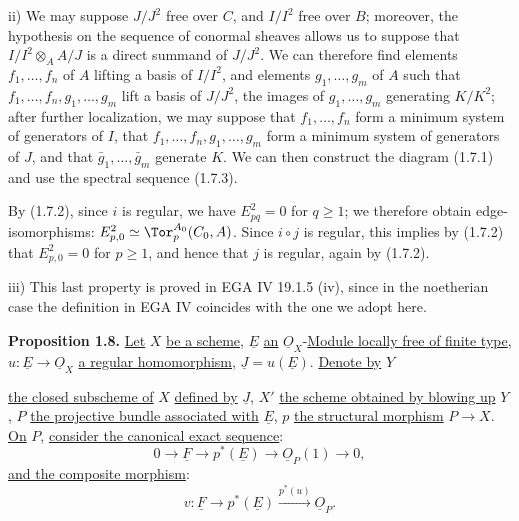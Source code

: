 ii) We may suppose $J/J^2$ free over $C$, and $I/I^2$ free over $B$; moreover, the hypothesis on the sequence of conormal sheaves allows us to suppose that $I/I^2\otimes_A A/J$ is a direct summand of $J/J^2$. We can therefore find elements $f_1,\ldots,f_n$ of $A$ lifting a basis of $I/I^2$, and elements $g_1,\ldots,g_m$ of $A$ such that $f_1,\ldots,f_n,g_1,\ldots,g_m$ lift a basis of $J/J^2$, the images of $g_1,\ldots,g_m$ generating $K/K^2$; after further localization, we may suppose that $f_1,\ldots,f_n$ form a minimum system of generators of $I$, that $f_1,\ldots,f_n,g_1,\ldots,g_m$ form a minimum system of generators of $J$, and that $\bar g_1,\ldots,\bar g_m$ generate $K$. We can then construct the diagram (1.7.1) and use the spectral sequence (1.7.3).

By (1.7.2), since $i$ is regular, we have $E^2_{pq}=0$ for $q\geq1$; we therefore obtain edge-isomorphisms: $E^2_{p,0}\simeq\Tor_p^{A_0}(C_0,A)$. Since $i\circ j$ is regular, this implies by (1.7.2) that $E^2_{p,0}=0$ for $p\geq1$, and hence that $j$ is regular, again by (1.7.2).

iii) This last property is proved in EGA IV 19.1.5 (iv), since in the noetherian case the definition in EGA IV coincides with the one we adopt here.

\textbf{Proposition 1.8.} \uline{Let} \(X\) \uline{be a scheme}, \(\underline{E}\) \uline{an} \(\underline{O}_X\)-\uline{Module locally free of finite type}, \(u:\underline{E}\to\underline{O}_X\) \uline{a regular homomorphism}, \(\underline{J}=u(\underline{E})\). \uline{Denote by} \(Y\)

%
\uline{the closed subscheme of} \(X\) \uline{defined by} \(\underline{J}\), \(X'\) \uline{the scheme obtained by blowing up} \(Y\), \(P\) \uline{the projective bundle associated with} \(\underline{E}\), \(p\) \uline{the structural morphism} \(P\to X\). \uline{On} \(P\), \uline{consider the canonical exact sequence}:
\[
0\to \underline{F}\to p^*(\underline{E})\to\underline{O}_P(1)\to0,
\]
\uline{and the composite morphism}:
\[
 v:\underline{F}\longrightarrow p^*(\underline{E})\xrightarrow{p^*(u)}\underline{O}_P .
\]

